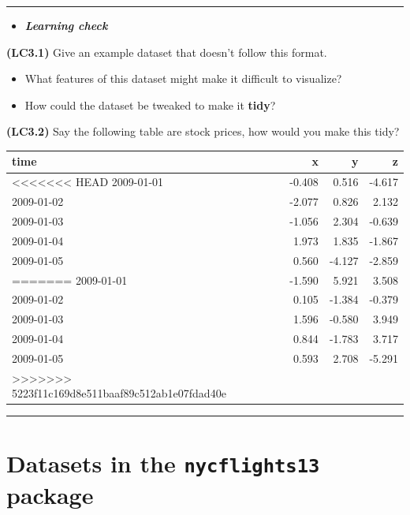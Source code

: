 \documentclass[]{tufte-book}
\let\oldrule=\rule
\renewcommand{\rule}[1]{\oldrule{\linewidth}}
\providecommand{\tightlist}{%
  \setlength{\itemsep}{0pt}\setlength{\parskip}{0pt}}
\newenvironment{rmdblock}[1]
  {\begin{shaded*}
  \begin{itemize}
  \renewcommand{\labelitemi}{
    \raisebox{-.7\height}[0pt][0pt]{
    }
  }
  \item
  }
  {
  \end{itemize}
  \end{shaded*}
  }
\newenvironment{learncheck}
  {\begin{rmdblock}{warning}}
  {\end{rmdblock}}
\begin{document}
\begin{center}\rule{0.5\linewidth}{\linethickness}\end{center}

\begin{learncheck}
\textbf{\emph{Learning check}}
\end{learncheck}

\textbf{(LC3.1)} Give an example dataset that doesn't follow this
format.

\begin{itemize}
\tightlist
\item
  What features of this dataset might make it difficult to visualize?\\
\item
  How could the dataset be tweaked to make it \textbf{tidy}?
\end{itemize}

\textbf{(LC3.2)} Say the following table are stock prices, how would you
make this tidy?

\begin{tabular}{l|r|r|r}
\hline
time & x & y & z\\
\hline
<<<<<<< HEAD
2009-01-01 & -0.408 & 0.516 & -4.617\\
\hline
2009-01-02 & -2.077 & 0.826 & 2.132\\
\hline
2009-01-03 & -1.056 & 2.304 & -0.639\\
\hline
2009-01-04 & 1.973 & 1.835 & -1.867\\
\hline
2009-01-05 & 0.560 & -4.127 & -2.859\\
=======
2009-01-01 & -1.590 & 5.921 & 3.508\\
\hline
2009-01-02 & 0.105 & -1.384 & -0.379\\
\hline
2009-01-03 & 1.596 & -0.580 & 3.949\\
\hline
2009-01-04 & 0.844 & -1.783 & 3.717\\
\hline
2009-01-05 & 0.593 & 2.708 & -5.291\\
>>>>>>> 5223f11c169d8e511baaf89c512ab1e07fdad40e
\hline
\end{tabular}

\begin{center}\rule{0.5\linewidth}{\linethickness}\end{center}

\section{\texorpdfstring{Datasets in the \texttt{nycflights13}
package}{Datasets in the nycflights13 package}}\label{datasets-in-the-nycflights13-package}
\end{document}
